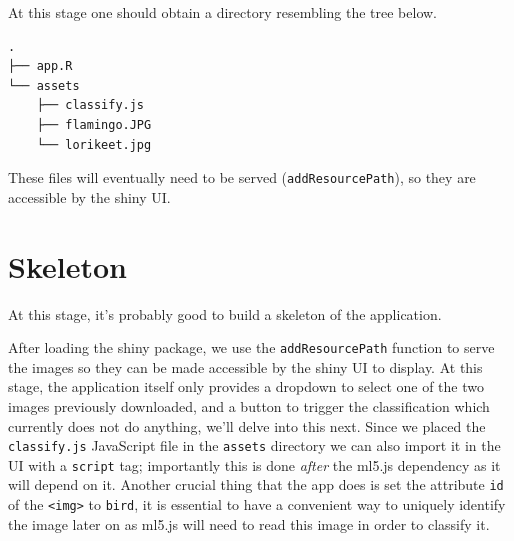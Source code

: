 \documentclass[
  10pt,
]{krantz}
\begin{document}
At this stage one should obtain a directory resembling the tree below.

\begin{verbatim}
.
├── app.R
└── assets
    ├── classify.js
    ├── flamingo.JPG
    └── lorikeet.jpg
\end{verbatim}

These files will eventually need to be served (\texttt{addResourcePath}), so they are accessible by the shiny UI.

\hypertarget{shiny-complete-skeleton}{%
\section{Skeleton}\label{shiny-complete-skeleton}}

At this stage, it's probably good to build a skeleton of the application.

After loading the shiny package, we use the \texttt{addResourcePath} function to serve the images so they can be made accessible by the shiny UI to display. At this stage, the application itself only provides a dropdown to select one of the two images previously downloaded, and a button to trigger the classification which currently does not do anything, we'll delve into this next. Since we placed the \texttt{classify.js} JavaScript file in the \texttt{assets} directory we can also import it in the UI with a \texttt{script} tag; importantly this is done \emph{after} the ml5.js dependency as it will depend on it. Another crucial thing that the app does is set the attribute \texttt{id} of the \texttt{\textless{}img\textgreater{}} to \texttt{bird}, it is essential to have a convenient way to uniquely identify the image later on as ml5.js will need to read this image in order to classify it.
\end{document}
